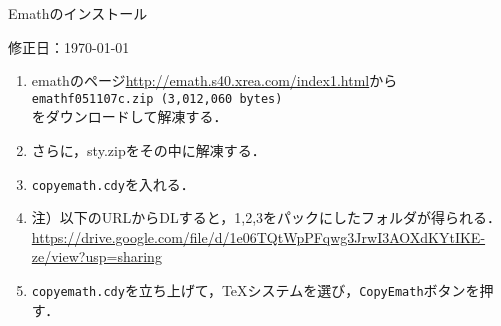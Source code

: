 \documentclass{ujarticle}
\begin{document}
\begin{center}
Emathのインストール
\end{center}

\vspace{-5mm}

\hfill 修正日：\today

\begin{enumerate}[\bf\large 1.]
\item emathのページ\url{http://emath.s40.xrea.com/index1.html}から\\
\hspace*{4zw}\verb|emathf051107c.zip (3,012,060 bytes)|\\
をダウンロードして解凍する．
\item さらに，sty.zipをその中に解凍する．
\item \verb|copyemath.cdy|を入れる．

\item[]\hspace*{1zw}注）以下のURLからDLすると，1,2,3をパックにしたフォルダが得られる．\\
\hspace*{4zw}\url{https://drive.google.com/file/d/1e06TQtWpPFqwg3JrwI3AOXdKYtIKE-ze/view?usp=sharing}

\item \verb|copyemath.cdy|を立ち上げて，TeXシステムを選び，\verb|CopyEmath|ボタンを押す．
\end{enumerate}
\end{document}
